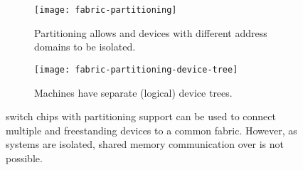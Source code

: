 \begin{figure}
    \centering
    \begin{subfigure}{\linewidth}
        \centering
        \texttt{[image: fabric-partitioning]}
        \caption{Partitioning allows  and devices with different address domains to be isolated.}
    \end{subfigure}
    \par\vspace{5mm}
    \begin{subfigure}{\linewidth}
        \centering
        \texttt{[image: fabric-partitioning-device-tree]}
        \caption{Machines have separate (logical)  device trees.}
    \end{subfigure}
    \caption[ switch chips with partitioning support can be used to connect multiple  and freestanding devices to a common  fabric.]
    { switch chips with partitioning support can be used to connect multiple  and freestanding devices to a common  fabric. However, as systems are isolated, shared memory communication over  is not possible.}
  	\label{fig:partitioning}
\end{figure}



